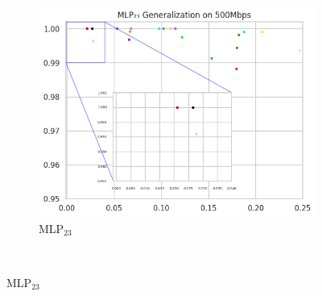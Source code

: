\documentclass[a4paper,fleqn]{cas-sc}
\begin{document}
\begin{figure}[h!]
\begin{minipage}[t]{0.46\textwidth}
\begin{subfigure}[t]{0.33\textwidth}
			\includegraphics[draft=false, width=\textwidth]{./figs/Generalizacao-MLP23-500Mbps.png} 
			\caption{MLP$_{23}$}
			\label{fig:Generalizacao-MLP23-500Mbps}
		\end{subfigure}%
		~
		

\end{minipage}
\end{figure}
\end{document}
